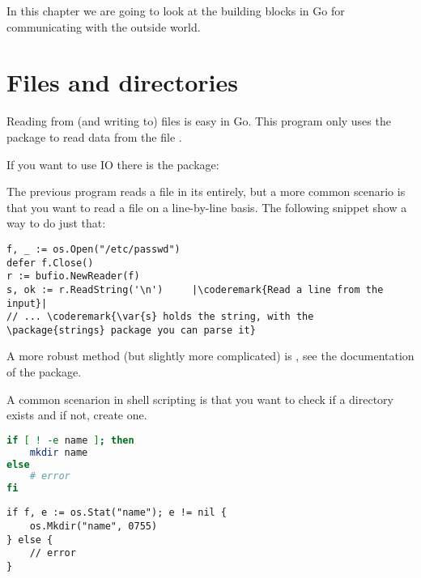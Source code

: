 \noindent{}In this chapter we are going to look at the building blocks in Go for 
communicating with the outside world.

\section{Files and directories}
Reading from (and writing to) files is easy in Go. This program
only uses the  package to read data from the file .

\showremarks
If you want to use  IO there is the
 package:

\showremarks

The previous program reads a file in its entirely, but a more common scenario is that
you want to read a file on a line-by-line basis. The following snippet show a way
to do just that:

\begin{lstlisting}
f, _ := os.Open("/etc/passwd")
defer f.Close()
r := bufio.NewReader(f)
s, ok := r.ReadString('\n')     |\coderemark{Read a line from the input}|
// ... \coderemark{\var{s} holds the string, with the \package{strings} package you can parse it}
\end{lstlisting}

A more robust method (but slightly more complicated) is , see the documentation
of the  package.

A common scenarion in shell scripting is that you want to check if a directory
exists and if not, create one. 

\begin{minipage}{.5\textwidth}
\begin{lstlisting}[language=sh,caption={Create a directory in the shell}]
if [ ! -e name ]; then
    mkdir name
else
    # error
fi
\end{lstlisting}
\end{minipage}
\hspace{1em}
\begin{minipage}{.5\textwidth}
\begin{lstlisting}[caption={Create a directory with Go}]
if f, e := os.Stat("name"); e != nil {
    os.Mkdir("name", 0755)
} else {
    // error
}
\end{lstlisting}
\end{minipage}

